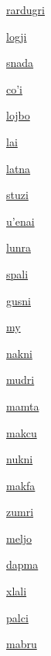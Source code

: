 {\hyperlink{val:rardugri}{rardugri}}{}{}{}

{\hyperlink{val:logji}{logji}}{}{}{}

{\hyperlink{val:snada}{snada}}{}{}{}

{\hyperlink{val:cohi}{co'i}}{}{}{}

{\hyperlink{val:lojbo}{lojbo}}{}{}{}

{\hyperlink{val:lai}{lai}}{}{}{}

{\hyperlink{val:latna}{latna}}{}{}{}

{\hyperlink{val:stuzi}{stuzi}}{}{}{}

{\hyperlink{val:uhenai}{u'enai}}{}{}{}

{\hyperlink{val:lunra}{lunra}}{}{}{}

{\hyperlink{val:spali}{spali}}{}{}{}

{\hyperlink{val:gusni}{gusni}}{}{}{}

{\hyperlink{val:my}{my}}{}{}{}

{\hyperlink{val:nakni}{nakni}}{}{}{}

{\hyperlink{val:mudri}{mudri}}{}{}{}

{\hyperlink{val:mamta}{mamta}}{}{}{}

{\hyperlink{val:makcu}{makcu}}{}{}{}

{\hyperlink{val:nukni}{nukni}}{}{}{}

{\hyperlink{val:makfa}{makfa}}{}{}{}

{\hyperlink{val:zumri}{zumri}}{}{}{}

{\hyperlink{val:meljo}{meljo}}{}{}{}

{\hyperlink{val:dapma}{dapma}}{}{}{}

{\hyperlink{val:xlali}{xlali}}{}{}{}

{\hyperlink{val:palci}{palci}}{}{}{}

{\hyperlink{val:mabru}{mabru}}{}{}{}


